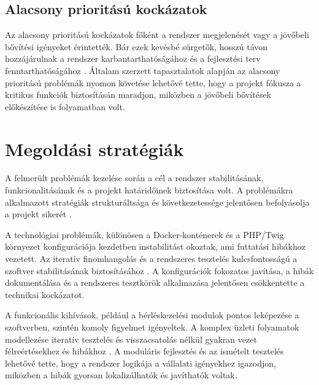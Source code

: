 \subsection{Alacsony prioritású kockázatok}

Az alacsony prioritású kockázatok főként a rendszer megjelenését vagy a jövőbeli bővítési igényeket érintették.  
Bár ezek kevésbé sürgetők, hosszú távon hozzájárulnak a rendszer karbantarthatóságához és a fejlesztési terv fenntarthatóságához \cite{Szalay2018,Kaposi2019}.  
Általam szerzett tapasztalatok alapján az alacsony prioritású problémák nyomon követése lehetővé tette, 
hogy a projekt fókusza a kritikus funkciók biztosításán maradjon, miközben a jövőbeli bővítések előkészítése is folyamatban volt.

\section{Megoldási stratégiák}

A felmerült problémák kezelése során a cél a rendszer stabilitásának, funkcionalitásának és a projekt határidőinek biztosítása volt. 
A problémákra alkalmazott stratégiák strukturáltsága és 
következetessége jelentősen befolyásolja a projekt sikerét \cite{Hajdu2014,Szalay2018,Kaposi2019}.

A technológiai problémák, különösen a Docker-konténerek és a PHP/Twig környezet konfigurációja 
kezdetben instabilitást okoztak, ami futtatási hibákhoz vezetett. Az iteratív 
finomhangolás és a rendszeres tesztelés kulcsfontosságú a szoftver stabilitásának biztosításához \cite{Kovacs2016}. 
A konfigurációk fokozatos javítása, a hibák dokumentálása és a rendszeres tesztkörök alkalmazása jelentősen csökkentette a technikai kockázatot.

A funkcionális kihívások, például a bérléskezelési modulok pontos leképezése a szoftverben, szintén komoly figyelmet igényeltek. 
A komplex üzleti folyamatok modellezése iteratív tesztelés és 
visszacsatolás nélkül gyakran vezet félreértésekhez és hibákhoz \cite{Szalay2018,Kaposi2019}. 
A moduláris fejlesztés és az ismételt tesztelés lehetővé tette, hogy 
a rendszer logikája a vállalati igényekhez igazodjon, miközben a hibák gyorsan lokalizálhatók és javíthatók voltak.

